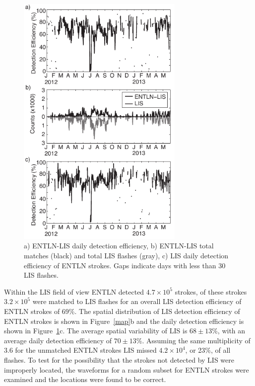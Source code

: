 \begin{figure}[t]
   \centering
   \noindent\includegraphics[width=19pc,angle=0]{entln_lis/Figures/de.pdf}
   \caption{a) ENTLN-LIS daily detection efficiency,
   		b) ENTLN-LIS total matches (black) and total LIS flashes (gray),
		c) LIS daily detection efficiency of ENTLN strokes.
		Gaps indicate days with less than 30 LIS flashes.
		}
   \label{de}
\end{figure}

Within the LIS field of view ENTLN detected $4.7\times10^5$ strokes, of these strokes $3.2\times10^5$ were matched to LIS flashes for an overall LIS detection efficiency of ENTLN strokes of 69\%.
The spatial distribution of LIS detection efficiency of ENTLN strokes is shown in Figure~\ref{map}b and the daily detection efficiency is shown in Figure~\ref{de}c.
The average spatial variability of LIS is $68 \pm 13$\%, with an average daily detection efficiency of $70 \pm 13$\%.
Assuming the same multiplicity of 3.6 for the unmatched ENTLN strokes LIS missed $4.2\times10^4$, or 23\%, of all flashes.
To test for the possibility that the strokes not detected by LIS were improperly located, the waveforms for a random subset for ENTLN strokes were examined and the locations were found to be correct.

